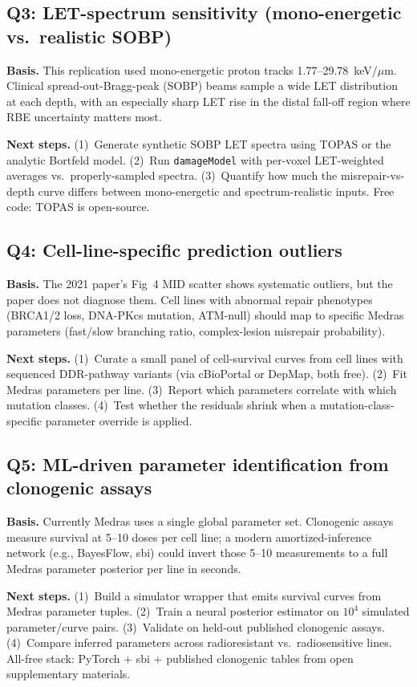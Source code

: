 \subsection*{Q3: LET-spectrum sensitivity (mono-energetic vs.\ realistic SOBP)}
\textbf{Basis.} This replication used mono-energetic proton tracks
1.77--29.78~keV/$\mu$m. Clinical spread-out-Bragg-peak (SOBP) beams
sample a wide LET distribution at each depth, with an especially sharp LET
rise in the distal fall-off region where RBE uncertainty matters most.

\textbf{Next steps.}
(1)~Generate synthetic SOBP LET spectra using TOPAS or the analytic
Bortfeld model. (2)~Run \texttt{damageModel} with per-voxel LET-weighted
averages vs.\ properly-sampled spectra. (3)~Quantify how much the
misrepair-vs-depth curve differs between mono-energetic and spectrum-realistic
inputs. Free code: TOPAS is open-source.

\subsection*{Q4: Cell-line-specific prediction outliers}
\textbf{Basis.} The 2021 paper's Fig~4 MID scatter shows systematic
outliers, but the paper does not diagnose them. Cell lines with abnormal
repair phenotypes (BRCA1/2 loss, DNA-PKcs mutation, ATM-null) should map to
specific Medras parameters (fast/slow branching ratio, complex-lesion
misrepair probability).

\textbf{Next steps.}
(1)~Curate a small panel of cell-survival curves from cell lines with
sequenced DDR-pathway variants (via cBioPortal or DepMap, both free).
(2)~Fit Medras parameters per line. (3)~Report which parameters correlate
with which mutation classes. (4)~Test whether the residuals shrink when a
mutation-class-specific parameter override is applied.

\subsection*{Q5: ML-driven parameter identification from clonogenic assays}
\textbf{Basis.} Currently Medras uses a single global parameter set.
Clonogenic assays measure survival at 5--10 doses per cell line; a modern
amortized-inference network (e.g., BayesFlow, sbi) could invert those
5--10 measurements to a full Medras parameter posterior per line in seconds.

\textbf{Next steps.}
(1)~Build a simulator wrapper that emits survival curves from Medras
parameter tuples. (2)~Train a neural posterior estimator on $10^4$
simulated parameter/curve pairs. (3)~Validate on held-out published
clonogenic assays. (4)~Compare inferred parameters across radioresistant
vs.\ radiosensitive lines. All-free stack: PyTorch + sbi + published
clonogenic tables from open supplementary materials.
